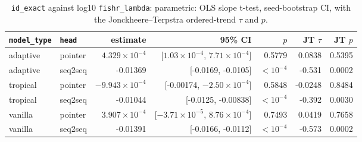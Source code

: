 \documentclass[10pt]{article}
\begin{document}
{\small
\begin{longtable}{llrrrrr}
\caption{\texttt{id\_exact} against log10 \texttt{fishr\_lambda}: parametric: OLS slope t-test, seed-bootstrap CI, with the Jonckheere--Terpstra ordered-trend $\tau$ and $p$.}\label{tab:trend-id_exact}\\
\toprule
\texttt{model\_type} & \texttt{head} & estimate & 95\% CI & $p$ & JT $\tau$ & JT $p$\\
\midrule
\endhead
adaptive & pointer & $4.329\times10^{-4}$ & [$1.03\times10^{-4}$, $7.71\times10^{-4}$] & 0.5779 & 0.0838 & 0.5395\\
adaptive & seq2seq & -0.01369 & [-0.0169, -0.0105] & $<10^{-4}$ & -0.531 & 0.0002\\
tropical & pointer & $-9.943\times10^{-4}$ & [-0.00174, $-2.50\times10^{-4}$] & 0.5848 & -0.0248 & 0.8484\\
tropical & seq2seq & -0.01044 & [-0.0125, -0.00838] & $<10^{-4}$ & -0.392 & 0.0030\\
vanilla & pointer & $3.907\times10^{-4}$ & [$-3.71\times10^{-5}$, $8.76\times10^{-4}$] & 0.7493 & 0.0419 & 0.7658\\
vanilla & seq2seq & -0.01391 & [-0.0166, -0.0112] & $<10^{-4}$ & -0.573 & 0.0002\\
\bottomrule
\end{longtable}
}
\end{document}
